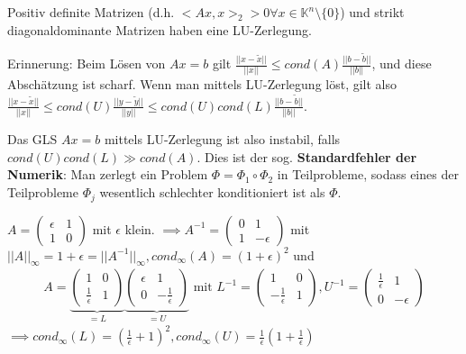 \begin{example}
	Positiv definite Matrizen (d.h. $<Ax,x>_2 > 0 \forall x \in \mathbb{K}^n\setminus\{0\}$) und strikt diagonaldominante Matrizen haben eine LU-Zerlegung.
\end{example}

Erinnerung: Beim Lösen von $Ax=b$ gilt $\frac{||x-\tilde{x}||}{||x||} \leq cond(A) \frac{||b-\tilde{b}||}{||b||}$, und diese Abschätzung ist scharf. Wenn man mittels LU-Zerlegung löst, gilt also $\frac{||x-\tilde{x}||}{||x||} \leq cond(U)\frac{||y-\tilde{y}||}{||y||} \leq cond(U)cond(L) \frac{||b-\tilde{b}||}{||b||}$.

\begin{remark}
	Das GLS $Ax=b$ mittels LU-Zerlegung ist also instabil, falls $cond(U)cond(L) \gg cond(A)$. Dies ist der sog. \textbf{Standardfehler der Numerik}: Man zerlegt ein Problem $\Phi = \Phi_1 \circ \Phi_2$ in Teilprobleme, sodass eines der Teilprobleme $\Phi_j$ wesentlich schlechter konditioniert ist als $\Phi$.
\end{remark}

\begin{example}
	$A = \left(\begin{matrix}
		\epsilon & 1\\
		1 & 0
	\end{matrix}\right)$ mit $\epsilon$ klein. $\implies A^{-1} = \left(\begin{matrix}
		0 & 1\\
		1 & -\epsilon
	\end{matrix}\right)$ mit $||A||_\infty = 1 + \epsilon = ||A^{-1}||_\infty, cond_\infty(A) = (1+\epsilon)^2$ und
	\begin{align*}
		A = \underbrace{\left(\begin{matrix}
				1 & 0\\
				\frac{1}{\epsilon} & 1
			\end{matrix}\right)}_{=L} \underbrace{\left(\begin{matrix}
			\epsilon & 1\\
			0 & -\frac{1}{\epsilon}
			\end{matrix}\right)}_{=U} \text{ mit } L^{-1} = \left(\begin{matrix}
			1 & 0\\
			-\frac{1}{\epsilon} & 1
		\end{matrix}\right), U^{-1} = \left(\begin{matrix}
			\frac{1}{\epsilon} & 1\\
			0 & -\epsilon
		\end{matrix}\right)
	\end{align*}
	$\implies cond_\infty(L) = (\frac{1}{\epsilon} + 1)^2, cond_\infty(U) = \frac{1}{\epsilon}(1 + \frac{1}{\epsilon})$
\end{example}

